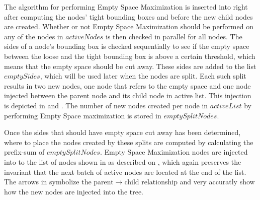 The algorithm for performing Empty Space Maximization is inserted into
 right after computing the nodes' tight bounding
boxes and before the new child nodes are created. Whether or not Empty Space
Maximization should be performed on any of the nodes in $activeNodes$ is then
checked in parallel for all nodes. The sides of a node's bounding box is checked
sequentially to see if the empty space between the loose and the tight bounding
box is above a certain threshold, which means that the empty space should be cut
away. These sides are added to the list $emptySides$, which will be used later
when the nodes are split. Each such split results in two new nodes, one node
that refers to the empty space and one node injected between the parent node and
its child node in active list. This injection is depicted in
 and . The
number of new nodes created per node in $activeList$ by performing Empty Space
maximization is stored in $emptySplitNodes$.

Once the sides that should have empty space cut away has been determined, where
to place the nodes created by these splits are computed by calculating the
prefix-sum of $emptySplitNodes$. Empty Space Maximization nodes are injected
into to the list of nodes shown in  as described on
, which again preserves the invariant that the
next batch of active nodes are located at the end of the list. The arrows in
 symbolize the parent$\rightarrow$child
relationship and very accuratly show how the new nodes are injected into the
tree.

